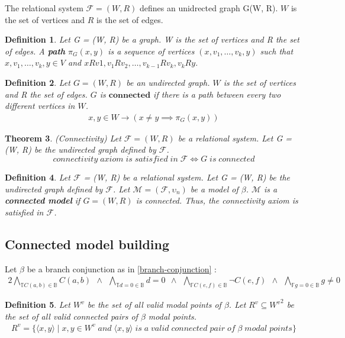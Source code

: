 \documentclass{article}
\newcommand\ST{\mathbb{T}}
\newcommand\SF{\mathbb{F}}
\newcommand\SB{\mathbb{B}}
\newcommand\M{\mathcal{M}}
\newcommand\F{\mathcal{F}}
\newtheorem{theorem}{Theorem}[section]
\newtheorem{defn}[theorem]{Definition}
\newcommand{\BranchConjunction}{%
\begin{alignat}{2}
			\bigwedge_{\ST C(a,b)\in{\SB}} C(a, b) \:\: \wedge \:\:
			\bigwedge_{\ST d = 0\in{\SB}} d = 0 \:\: \wedge \:\:
			\bigwedge_{\SF C(e,f)\in{\SB}} \neg C(e, f) \:\: \wedge \:\:
			\bigwedge_{\SF g = 0\in{\SB}} g \neq 0
\end{alignat}%
}
\newcommand{\pair}[2]{ \langle #1, #2 \rangle }
\newcommand{\pairXY}{ \pair{x}{y} }
\begin{document}
	The relational system $\F = (W, R)$ defines an unidrected graph G(W, R). $W$ is the set of vertices and $R$ is the set of edges.

	\begin{defn}
		Let G = (W, R) be a graph. W is the set of vertices and R the set of edges. A \textbf{path} $\pi_G(x, y)$ is a sequence of vertices $(x, v_1, \dotsc , v_k, y)$ such that $x,  v_1,\dotsc,v_k, y \in V$ and $xRv1,v_1Rv_2,\dotsc, v_{k-1}Rv_k, v_kRy$.
	\end{defn}

	\begin{defn}
		Let $G = (W, R)$ be an undirected graph. $W$ is the set of vertices and R the set of edges. $G$ is $\mathbf{connected}$ if there is a path between every two different vertices in $W$.
		\begin{align*}
			x, y \in W \rightarrow (x \neq y \implies \pi_G(x, y))
		\end{align*}
	\end{defn}

	\begin{theorem}
		(Connectivity) Let $\F = (W, R)$ be a relational system. Let G = (W, R) be the undirected graph defined by $\F$.
		\label{connectivity-theorem}\begin{equation}
			connectivity \; axiom \; is \; satisfied\; in \; \F \iff
			G \; is \; connected
		\end{equation}
	\end{theorem}

	\begin{defn}
		Let $\F$ = (W, R) be a relational system. Let G = (W, R) be the undirected graph defined by $\F$. Let $\M = (\F, \upsilon_n)$ be a model of $\beta$. $\M$ is a \textbf{connected model} if $G = (W, R)$ is connected. Thus, the connectivity axiom is satisfied in $\F$.
	\end{defn}

	\subsection{Connected model building}
	\label{connected-model-building}

		Let $\beta$ be a branch conjunction as in \ref{branch-conjunction} :
		\nonumber\BranchConjunction

		\begin{defn}\label{set-all-valid-modal-point-pairs}
			Let $W^v$ be the set of all valid modal points of $\beta$. Let $R^v \subseteq {W^v}^2$ be the set of all valid connected pairs of $\beta$ modal points.
			\begin{align*}
				R^v = \{ \pairXY  \mid x, y \in W^v \; and \; \pairXY \; is \; a \; valid \; connected \; pair \; of \; \beta \; modal \; points\}
			\end{align*}
		\end{defn}
\end{document}
